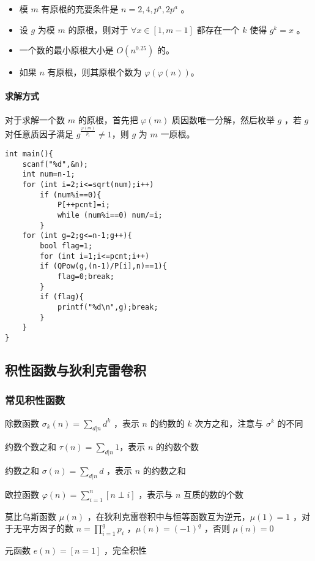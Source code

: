 \documentclass[UTF-8]{ctexart}
\begin{document}
	\begin{itemize}
		\item 模 $m$ 有原根的充要条件是 $n=2,4,p^a,2p^a$ 。
		\item 设 $g$ 为模 $m$ 的原根，则对于 $\forall x \in [1,m-1]$ 都存在一个 $k$ 使得 $g^k=x$ 。
		\item 一个数的最小原根大小是 $O(n^{0.25})$ 的。
		\item 如果 $n$ 有原根，则其原根个数为 $\varphi(\varphi(n))$。
	\end{itemize}
	
	\paragraph{求解方式} 对于求解一个数 $m$ 的原根，首先把 $\varphi(m)$ 质因数唯一分解，然后枚举 $g$ ，若 $g$ 对任意质因子满足 $g^{\frac{\varphi(m)}{p_i}} \ne 1$，则 $g$ 为 $m$ 一原根。
\begin{verbatim}
int main(){
    scanf("%d",&n);
    int num=n-1;
    for (int i=2;i<=sqrt(num);i++)
        if (num%i==0){
            P[++pcnt]=i;
            while (num%i==0) num/=i;
        }
    for (int g=2;g<=n-1;g++){
        bool flag=1;
        for (int i=1;i<=pcnt;i++)
        if (QPow(g,(n-1)/P[i],n)==1){
            flag=0;break;
        }
        if (flag){
            printf("%d\n",g);break;
        }
    }
}
\end{verbatim}
	\subsection{积性函数与狄利克雷卷积}
	\subsubsection{常见积性函数}
	除数函数 $\sigma _ k (n)=\sum _ {d|n} d ^ k$ ，表示 $n$ 的约数的 $k$ 次方之和，注意与 $\sigma ^ k$ 的不同   
	
	约数个数之和 $\tau(n)=\sum _ {d|n} 1$，表示 $n$  的约数个数  
	
	约数之和 $\sigma(n)=\sum _ {d|n} d$ ，表示 $n$  的约数之和  
	
	欧拉函数 $\varphi(n)=\sum _ {i=1} ^ n [n \perp i]$ ，表示与 $n$ 互质的数的个数  
	
	莫比乌斯函数 $\mu(n)$ ，在狄利克雷卷积中与恒等函数互为逆元，$\mu(1)=1$ ，对于无平方因子的数 $n=\prod _ {i=1} ^ q p _ i$ ，$\mu(n)=(-1) ^ q$ ，否则 $\mu(n)=0$  
	
	元函数 $e(n)=[n=1]$ ，完全积性  
	
\end{document}
